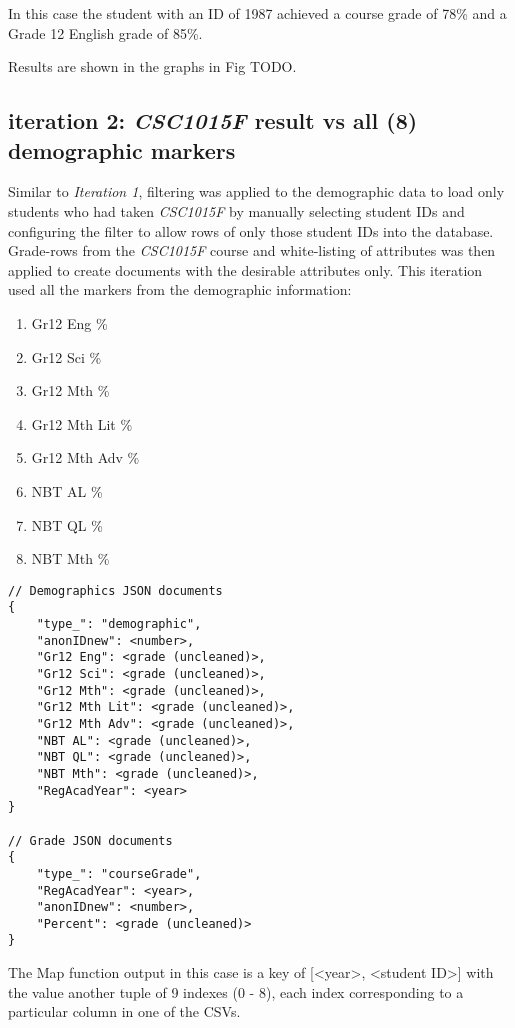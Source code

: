 In this case the student with an ID of 1987 achieved a course grade of 78\% and a Grade 12 English grade of 85\%.


Results are shown in the graphs in Fig TODO.

\subsection{iteration 2: \textit{CSC1015F} result vs all (8) demographic markers}
Similar to \textit{Iteration 1}, filtering was applied to the demographic data to load only students who had taken \textit{CSC1015F} by manually selecting student IDs and configuring the filter to allow rows of only those student IDs into the database. Grade-rows from the \textit{CSC1015F} course and white-listing of attributes was then applied to create documents with the desirable attributes only. This iteration used all the markers from the demographic information:

\begin{enumerate}
    \item Gr12 Eng \%
    \item Gr12 Sci \%
    \item Gr12 Mth \%
    \item Gr12 Mth Lit \%
    \item Gr12 Mth Adv \%
    \item NBT AL \%
    \item NBT QL \%
    \item NBT Mth \%
\end{enumerate}

\begin{verbatim}
// Demographics JSON documents
{
    "type_": "demographic",
    "anonIDnew": <number>,
    "Gr12 Eng": <grade (uncleaned)>,
    "Gr12 Sci": <grade (uncleaned)>,
    "Gr12 Mth": <grade (uncleaned)>,
    "Gr12 Mth Lit": <grade (uncleaned)>,
    "Gr12 Mth Adv": <grade (uncleaned)>,
    "NBT AL": <grade (uncleaned)>,
    "NBT QL": <grade (uncleaned)>,
    "NBT Mth": <grade (uncleaned)>,
    "RegAcadYear": <year>
}

// Grade JSON documents
{
    "type_": "courseGrade",
    "RegAcadYear": <year>,
    "anonIDnew": <number>,
    "Percent": <grade (uncleaned)>
}
\end{verbatim}

The Map function output in this case is a key of [<year>, <student ID>] with the value another tuple of 9 indexes (0 - 8), each index corresponding to a particular column in one of the CSVs.

